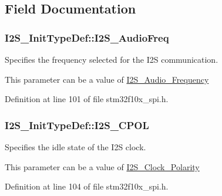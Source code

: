 \subsection{Field Documentation}
\hypertarget{struct_i2_s___init_type_def_a87674c5fbccad53b7646565f35d1fc0a}{
\subsubsection[{I2\-S\-\_\-\-Audio\-Freq}]{ I2\-S\-\_\-\-Init\-Type\-Def\-::\-I2\-S\-\_\-\-Audio\-Freq}}\label{struct_i2_s___init_type_def_a87674c5fbccad53b7646565f35d1fc0a}
\begin{DoxyVerb}    Specifies the frequency selected for the I2S communication.
\end{DoxyVerb}
 This parameter can be a value of \hyperlink{group___i2_s___audio___frequency}{I2\-S\-\_\-\-Audio\-\_\-\-Frequency} 

Definition at line 101 of file stm32f10x\-\_\-spi.\-h.

\hypertarget{struct_i2_s___init_type_def_aeb7741728520734ec2eab95d2143778c}{
\subsubsection[{I2\-S\-\_\-\-C\-P\-O\-L}]{ I2\-S\-\_\-\-Init\-Type\-Def\-::\-I2\-S\-\_\-\-C\-P\-O\-L}}\label{struct_i2_s___init_type_def_aeb7741728520734ec2eab95d2143778c}
\begin{DoxyVerb}         Specifies the idle state of the I2S clock.
\end{DoxyVerb}
 This parameter can be a value of \hyperlink{group___i2_s___clock___polarity}{I2\-S\-\_\-\-Clock\-\_\-\-Polarity} 

Definition at line 104 of file stm32f10x\-\_\-spi.\-h.

